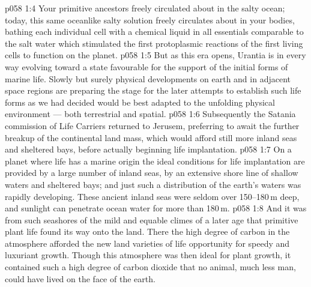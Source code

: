 \vs p058 1:4 Your primitive ancestors freely circulated about in the salty ocean; today, this same oceanlike salty solution freely circulates about in your bodies, bathing each individual cell with a chemical liquid in all essentials comparable to the salt water which stimulated the first protoplasmic reactions of the first living cells to function on the planet.
\vs p058 1:5 But as this era opens, Urantia is in every way evolving toward a state favourable for the support of the initial forms of marine life. Slowly but surely physical developments on earth and in adjacent space regions are preparing the stage for the later attempts to establish such life forms as we had decided would be best adapted to the unfolding physical environment --- both terrestrial and spatial.
\vs p058 1:6 Subsequently the Satania commission of Life Carriers returned to Jerusem, preferring to await the further breakup of the continental land mass, which would afford still more inland seas and sheltered bays, before actually beginning life implantation.
\vs p058 1:7 \pc On a planet where life has a marine origin the ideal conditions for life implantation are provided by a large number of inland seas, by an extensive shore line of shallow waters and sheltered bays; and just such a distribution of the earth’s waters was rapidly developing. These ancient inland seas were seldom over 150--180\,m deep, and sunlight can penetrate ocean water for more than 180\,m.
\vs p058 1:8 And it was from such seashores of the mild and equable climes of a later age that primitive plant life found its way onto the land. There the high degree of carbon in the atmosphere afforded the new land varieties of life opportunity for speedy and luxuriant growth. Though this atmosphere was then ideal for plant growth, it contained such a high degree of carbon dioxide that no animal, much less man, could have lived on the face of the earth.
